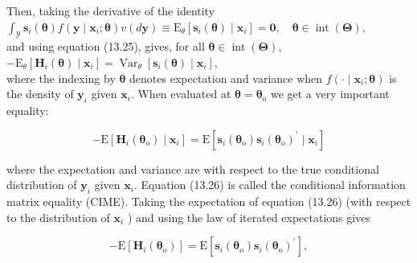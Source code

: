 \documentclass[10pt]{article}
\begin{document}
Then, taking the derivative of the identity\\
$\int_{\mathscr{Y}} \mathbf{s}_{i}(\boldsymbol{\theta}) f\left(\mathbf{y} \mid \mathbf{x}_{i} ; \boldsymbol{\theta}\right) v(d \mathbf{y}) \equiv \mathrm{E}_{\theta}\left[\mathbf{s}_{i}(\boldsymbol{\theta}) \mid \mathbf{x}_{i}\right]=\mathbf{0}, \quad \boldsymbol{\theta} \in \operatorname{int}(\boldsymbol{\Theta})$,\\
and using equation (13.25), gives, for all $\boldsymbol{\theta} \in \operatorname{int}(\boldsymbol{\Theta})$,\\
$-\mathrm{E}_{\theta}\left[\mathbf{H}_{i}(\boldsymbol{\theta}) \mid \mathbf{x}_{i}\right]=\operatorname{Var}_{\theta}\left[\mathbf{s}_{i}(\boldsymbol{\theta}) \mid \mathbf{x}_{i}\right]$,\\
where the indexing by $\boldsymbol{\theta}$ denotes expectation and variance when $f\left(\cdot \mid \mathbf{x}_{i} ; \boldsymbol{\theta}\right)$ is the density of $\mathbf{y}_{i}$ given $\mathbf{x}_{i}$. When evaluated at $\boldsymbol{\theta}=\boldsymbol{\theta}_{\mathrm{o}}$ we get a very important equality:


\begin{equation*}
-\mathrm{E}\left[\mathbf{H}_{i}\left(\boldsymbol{\theta}_{\mathrm{o}}\right) \mid \mathbf{x}_{i}\right]=\mathrm{E}\left[\mathbf{s}_{i}\left(\boldsymbol{\theta}_{\mathrm{o}}\right) \mathbf{s}_{i}\left(\boldsymbol{\theta}_{\mathrm{o}}\right)^{\prime} \mid \mathbf{x}_{i}\right] \tag{13.26}
\end{equation*}


where the expectation and variance are with respect to the true conditional distribution of $\mathbf{y}_{i}$ given $\mathbf{x}_{i}$. Equation (13.26) is called the conditional information matrix equality (CIME). Taking the expectation of equation (13.26) (with respect to the distribution of $\mathbf{x}_{i}$ ) and using the law of iterated expectations gives


\begin{equation*}
-\mathrm{E}\left[\mathbf{H}_{i}\left(\boldsymbol{\theta}_{\mathrm{o}}\right)\right]=\mathrm{E}\left[\mathbf{s}_{i}\left(\boldsymbol{\theta}_{\mathrm{o}}\right) \mathbf{s}_{i}\left(\boldsymbol{\theta}_{\mathrm{o}}\right)^{\prime}\right], \tag{13.27}
\end{equation*}
\end{document}
